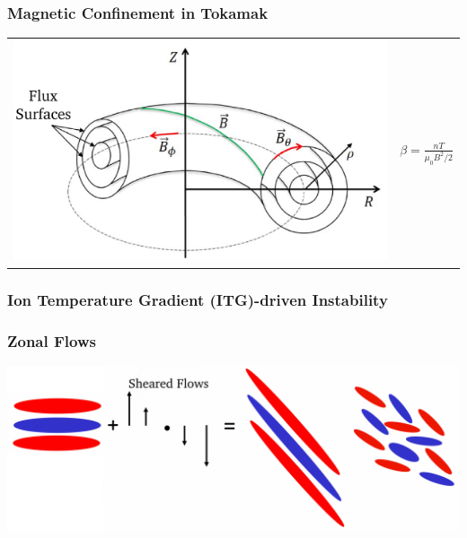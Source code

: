 \documentclass[compress,aspectratio=1610,noflama]{beamer}
\begin{document}
	\begin{frame}
		\frametitle{Magnetic Confinement in Tokamak}
		\begin{center}
			\begin{tabular}{>{\onslide<2->}c<{\onslide} >{\onslide<2->}c<{\onslide}}
				\includegraphics[width=0.6\paperwidth]{Theory/Tokamak-Torus.pdf} & $\beta = \frac{nT}{\mu_0 B^2/2}$
			\end{tabular}
		\end{center}
	\end{frame}

	\begin{frame}
		\frametitle{Ion Temperature Gradient (ITG)-driven Instability}
		\begin{center}
			\onslide<2->
		\end{center}
	\end{frame}


	\begin{frame}
		\frametitle{Zonal Flows}
		\begin{center}
			\includegraphics[width = 0.8\paperwidth]{Theory/Zonal-Flow-Generation.pdf}
		\end{center}
	\end{frame}
\end{document}
